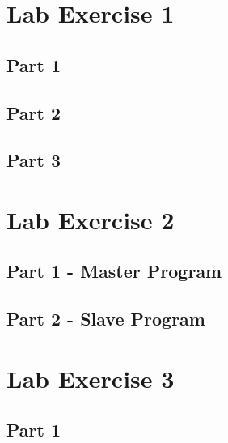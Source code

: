 \begin{appendices}
	\label{Appendix:start}
	\section{Lab Exercise 1}
	{
		\subsection{Part 1}
		{
			\label{appendix:ex1-1}
			
		}
		\subsection{Part 2}
		{
			\label{appendix:ex1-2}
			
		}
		\subsection{Part 3}
		{
			\label{appendix:ex1-3}
			
		}
	}
	\section{Lab Exercise 2}
	{
		\label{appendix:ex2}
		\subsection{Part 1 - Master Program}
		{
			\label{appendix:ex2-1}
			
		}
		\subsection{Part 2 - Slave Program}
		{
			\label{appendix:ex2-2}
			
		}
	}
	\section{Lab Exercise 3}
	{
		\subsection{Part 1}
		{
			\label{appendix:ex3-1}
			
		}
	}

\end{appendices}